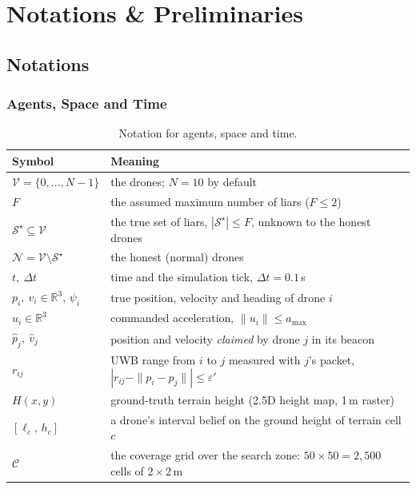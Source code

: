 \chapter[Preliminaries]{Notations \& Preliminaries}
\label{cp:prelim}

\parindent0pt

\section{Notations}
\label{sec:notation}

\subsection{Agents, Space and Time}

\begin{table}[h]
\centering
\renewcommand{\arraystretch}{1.2}
\begin{tabularx}{\linewidth}{@{}l X@{}}
\toprule
\textbf{Symbol} & \textbf{Meaning} \\
\midrule
$\mathcal{V}=\{0,\dots,N-1\}$ & the drones; $N=10$ by default \\
$F$ & the assumed maximum number of liars ($F\le 2$) \\
$\mathcal{S}^\star\subseteq\mathcal{V}$ & the true set of liars, $|\mathcal{S}^\star|\le F$, unknown to the honest drones \\
$\mathcal{N}=\mathcal{V}\setminus\mathcal{S}^\star$ & the honest (normal) drones \\
$t,\ \Delta t$ & time and the simulation tick, $\Delta t = 0.1$\,s \\
$p_i,\ v_i\in\mathbb{R}^3$, $\psi_i$ & true position, velocity and heading of drone $i$ \\
$u_i\in\mathbb{R}^3$ & commanded acceleration, $\|u_i\|\le a_{\max}$ \\
$\hat p_j,\ \hat v_j$ & position and velocity \emph{claimed} by drone $j$ in its beacon \\
$r_{ij}$ & UWB range from $i$ to $j$ measured with $j$'s packet, $|r_{ij}-\|p_i-p_j\||\le\varepsilon'$ \\
$H(x,y)$ & ground-truth terrain height (2.5D height map, 1\,m raster) \\
$[\ell_c,\,h_c]$ & a drone's interval belief on the ground height of terrain cell $c$ \\
$\mathcal{C}$ & the coverage grid over the search zone: $50\times50 = 2{,}500$ cells of $2\times2$\,m \\
\bottomrule
\end{tabularx}
\caption{Notation for agents, space and time.}
\label{tab:notation-agents}
\end{table}

